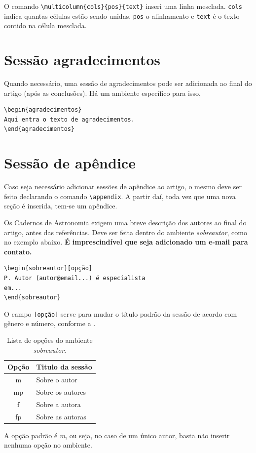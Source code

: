 \documentclass{cda}
\begin{document}
O comando \verb|\multicolumn{cols}{pos}{text}| inseri uma linha mesclada. \verb|cols| indica quantas células estão sendo unidas, \verb|pos| o alinhamento e \verb|text| é o texto contido na célula mesclada.

\section{Sessão agradecimentos}
Quando necessário, uma sessão de agradecimentos pode ser adicionada ao final do artigo (após as conclusões). Há um ambiente específico para isso,
\begin{verbatim}
\begin{agradecimentos}
Aqui entra o texto de agradecimentos.
\end{agradecimentos}
\end{verbatim}

\appendix

\section{Sessão de apêndice}
Caso seja necessário adicionar sessões de apêndice ao artigo, o mesmo deve ser feito declarando o comando \verb|\appendix|. A partir daí, toda vez que uma nova seção é inserida, tem-se um apêndice.

\begin{sobreautor}[m]
Os Cadernos de Astronomia exigem uma breve descrição dos autores ao final do artigo, antes das referências. Deve ser feita dentro do ambiente \textit{sobreautor}, como no exemplo abaixo. \textbf{É imprescindível que seja adicionado um e-mail para contato.}
\begin{verbatim}
\begin{sobreautor}[opção]
P. Autor (autor@email...) é especialista
em...
\end{sobreautor}
\end{verbatim}

O campo \verb|[opção]| serve para mudar o título padrão da sessão de acordo com gênero e número, conforme a .
\begin{table}[h!]
    \renewcommand{\arraystretch}{1.2}
	\centering
	\caption{Lista de opções do ambiente \textit{sobreautor}.}
	\label{tab:2}
	\begin{tabular}{c|l}
		\hline\hline
		Opção & Titulo da sessão \\
		\hline
		m & Sobre o autor \\
		\hline
		mp & Sobre os autores \\
		\hline
		f & Sobre a autora \\
		\hline
		fp & Sobre as autoras \\
		\hline\hline
	\end{tabular}
\end{table}

A opção padrão é \textit{m}, ou seja, no caso de um único autor, basta não inserir nenhuma opção no ambiente.
\end{sobreautor}
\end{document}

